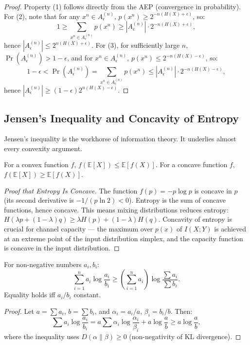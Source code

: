 \begin{proof}
Property (1) follows directly from the AEP (convergence in probability). For (2), note that for any $x^n \in A_\epsilon^{(n)}$, $p(x^n) \ge 2^{-n(H(X)+\epsilon)}$, so:
\[
1 \ge \sum_{x^n \in A_\epsilon^{(n)}} p(x^n) \ge |A_\epsilon^{(n)}| \cdot 2^{-n(H(X)+\epsilon)},
\]
hence $|A_\epsilon^{(n)}| \le 2^{n(H(X)+\epsilon)}$. For (3), for sufficiently large $n$, $\Pr(A_\epsilon^{(n)}) > 1-\epsilon$, and for $x^n \in A_\epsilon^{(n)}$, $p(x^n) \le 2^{-n(H(X)-\epsilon)}$, so:
\[
1-\epsilon < \Pr(A_\epsilon^{(n)}) = \sum_{x^n \in A_\epsilon^{(n)}} p(x^n) \le |A_\epsilon^{(n)}| \cdot 2^{-n(H(X)-\epsilon)},
\]
hence $|A_\epsilon^{(n)}| \ge (1-\epsilon) 2^{n(H(X)-\epsilon)}$.
\end{proof}

\subsection{Jensen's Inequality and Concavity of Entropy}
\label{sec:information:jensen}

Jensen's inequality is the workhorse of information theory. It underlies almost every convexity argument.

\begin{theorem}
For a convex function $f$, $f(\mathbb{E}[X]) \le \mathbb{E}[f(X)]$. For a concave function $f$, $f(\mathbb{E}[X]) \ge \mathbb{E}[f(X)]$.
\end{theorem}

\begin{proof}[Proof that Entropy Is Concave]
The function $f(p) = -p\log p$ is concave in $p$ (its second derivative is $-1/(p\ln 2) < 0$). Entropy is the sum of concave functions, hence concave. This means mixing distributions reduces entropy: $H(\lambda p + (1-\lambda)q) \ge \lambda H(p) + (1-\lambda)H(q)$. Concavity of entropy is crucial for channel capacity — the maximum over $p(x)$ of $I(X;Y)$ is achieved at an extreme point of the input distribution simplex, and the capacity function is concave in the input distribution.
\end{proof}

\begin{theorem}
For non-negative numbers $a_i, b_i$:
\[
\sum_{i=1}^n a_i \log \frac{a_i}{b_i} \ge \left(\sum_{i=1}^n a_i\right) \log \frac{\sum a_i}{\sum b_i}.
\]
Equality holds iff $a_i/b_i$ constant.
\end{theorem}

\begin{proof}
Let $a = \sum a_i$, $b = \sum b_i$, and $\alpha_i = a_i/a$, $\beta_i = b_i/b$. Then:
\[
\sum a_i \log\frac{a_i}{b_i} = a\sum\alpha_i\log\frac{\alpha_i}{\beta_i} + a\log\frac{a}{b} \ge a\log\frac{a}{b},
\]
where the inequality uses $D(\alpha\|\beta) \ge 0$ (non-negativity of KL divergence).
\end{proof}

